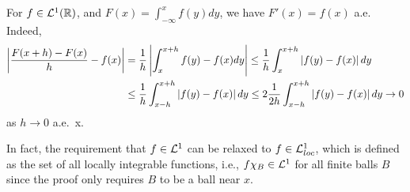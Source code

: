 \begin{remark}
    For $f\in\mathcal{L}^1(\mathbb{R})$, and $F(x) = \int_{-\infty}^x f(y)dy$, we 
    have $F'(x) = f(x)$ a.e. Indeed, 
    \begin{equation*}
        \begin{split}
            \left\lvert {\frac{F(x+h)-F(x)}{h}-f(x)} \right\rvert 
            &= \frac{1}{h}\left\lvert {\int_{x}^{x+h}f(y)-f(x)dy} \right\rvert 
            \leq \frac{1}{h}\int_{x}^{x+h}\left\lvert {f(y)-f(x)} \right\rvert dy \\ 
            &\leq \frac{1}{h}\int_{x-h}^{x+h}\left\lvert {f(y)-f(x)} \right\rvert dy 
            \leq 2\frac{1}{2h}\int_{x-h}^{x+h}\left\lvert {f(y)-f(x)} \right\rvert dy \to 0
        \end{split}
    \end{equation*}
    as $h\to 0$ a.e.\ x.
\end{remark}
\begin{remark}
    In fact, the requirement that $f\in\mathcal{L}^1$ can be relaxed to 
    $f\in\mathcal{L}^1_{loc}$, which is defined as the set of all locally 
    integrable functions, i.e., $f\chi_B\in\mathcal{L}^1$ for all finite 
    balls $B$ since the proof only requires $B$ to be a ball 
    near $x$. 
\end{remark} 